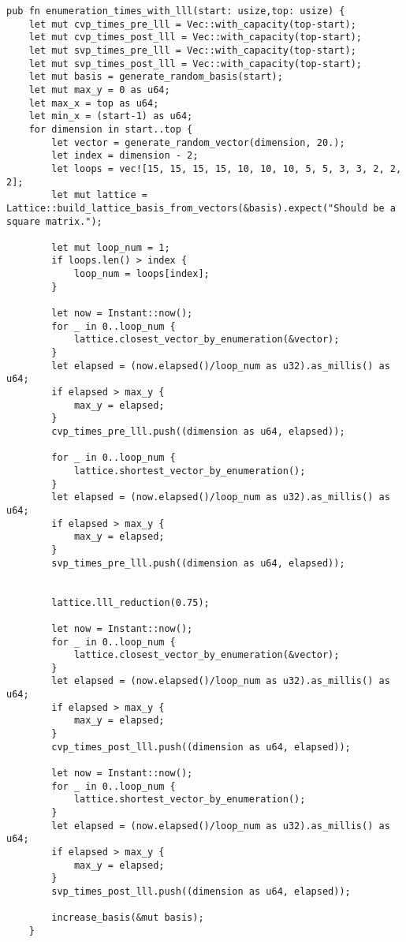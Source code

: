 \begin{verbatim}
pub fn enumeration_times_with_lll(start: usize,top: usize) {
    let mut cvp_times_pre_lll = Vec::with_capacity(top-start);
    let mut cvp_times_post_lll = Vec::with_capacity(top-start);
    let mut svp_times_pre_lll = Vec::with_capacity(top-start);
    let mut svp_times_post_lll = Vec::with_capacity(top-start);
    let mut basis = generate_random_basis(start);
    let mut max_y = 0 as u64;
    let max_x = top as u64;
    let min_x = (start-1) as u64;
    for dimension in start..top {
        let vector = generate_random_vector(dimension, 20.);
        let index = dimension - 2;
        let loops = vec![15, 15, 15, 15, 10, 10, 10, 5, 5, 3, 3, 2, 2, 2];
        let mut lattice = Lattice::build_lattice_basis_from_vectors(&basis).expect("Should be a square matrix.");

        let mut loop_num = 1;
        if loops.len() > index {
            loop_num = loops[index];
        }

        let now = Instant::now();
        for _ in 0..loop_num {
            lattice.closest_vector_by_enumeration(&vector);
        }
        let elapsed = (now.elapsed()/loop_num as u32).as_millis() as u64;
        if elapsed > max_y {
            max_y = elapsed;
        }
        cvp_times_pre_lll.push((dimension as u64, elapsed));

        for _ in 0..loop_num {
            lattice.shortest_vector_by_enumeration();
        }
        let elapsed = (now.elapsed()/loop_num as u32).as_millis() as u64;
        if elapsed > max_y {
            max_y = elapsed;
        }
        svp_times_pre_lll.push((dimension as u64, elapsed));


        lattice.lll_reduction(0.75);

        let now = Instant::now();
        for _ in 0..loop_num {
            lattice.closest_vector_by_enumeration(&vector);
        }
        let elapsed = (now.elapsed()/loop_num as u32).as_millis() as u64;
        if elapsed > max_y {
            max_y = elapsed;
        }
        cvp_times_post_lll.push((dimension as u64, elapsed));

        let now = Instant::now();
        for _ in 0..loop_num {
            lattice.shortest_vector_by_enumeration();
        }
        let elapsed = (now.elapsed()/loop_num as u32).as_millis() as u64;
        if elapsed > max_y {
            max_y = elapsed;
        }
        svp_times_post_lll.push((dimension as u64, elapsed));

        increase_basis(&mut basis);
    }


\end{verbatim}
